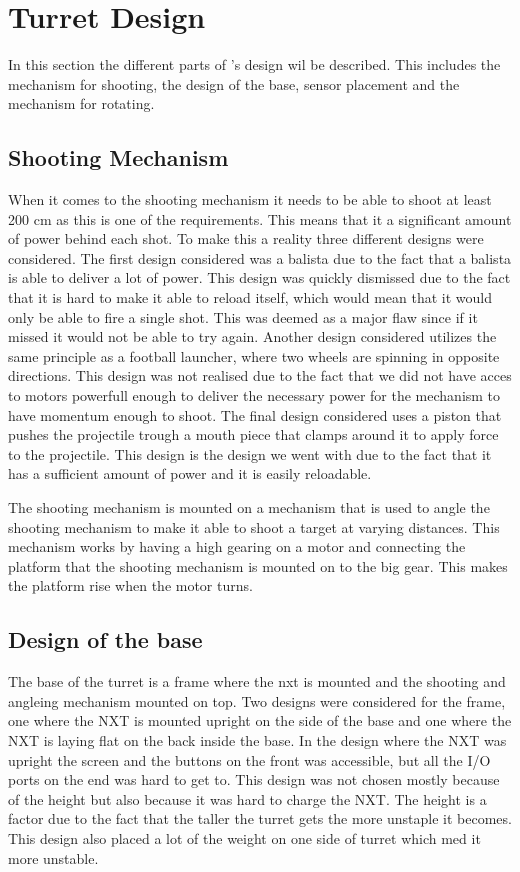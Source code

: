 \section{Turret Design}
In this section the different parts of \namep's design wil be described. This
includes the mechanism for shooting, the design of the base, sensor placement
and the mechanism for rotating.

\subsection{Shooting Mechanism}
When it comes to the shooting mechanism it needs to be able to shoot at least
200 cm as this is one of the requirements. This means that it a significant
amount of power behind each shot. To make this a reality three different designs
were considered. The first design considered was a balista due to the fact that
a balista is able to deliver a lot of power. This design was quickly dismissed
due to the fact that it is hard to make it able to reload itself, which would
mean that it would only be able to fire a single shot. This was deemed as a
major flaw since if it missed it would not be able to try again. Another design
considered utilizes the same principle as a football launcher, where two wheels
are spinning in opposite directions. This design was not realised due to the
fact that we did not have acces to motors powerfull enough to deliver the
necessary power for the mechanism to have momentum enough to shoot. The final
design considered uses a piston that pushes the projectile trough a mouth piece
that clamps around it to apply force to the projectile. This design is the
design we went with due to the fact that it has a sufficient amount of power and
it is easily reloadable.\nl

The shooting mechanism is mounted on a mechanism that is used to angle the
shooting mechanism to make it able to shoot a target at varying distances. This
mechanism works by having a high gearing on a motor and connecting the platform
that the shooting mechanism is mounted on to the big gear. This makes the
platform rise when the motor turns.

\subsection{Design of the base}
The base of the turret is a frame where the nxt is mounted and the shooting and
angleing mechanism mounted on top. Two designs were considered for the frame,
one where the NXT is mounted upright on the side of the base and one where the
NXT is laying flat on the back inside the base. In the design where the NXT was
upright the screen and the buttons on the front was accessible, but all the I/O
ports on the end was hard to get to. This design was not chosen mostly because
of the height but also because it was hard to charge the NXT. The height is a
factor due to the fact that the taller the turret gets the more unstaple it
becomes. This design also placed a lot of the weight on one side of turret
which med it more unstable.\nl

